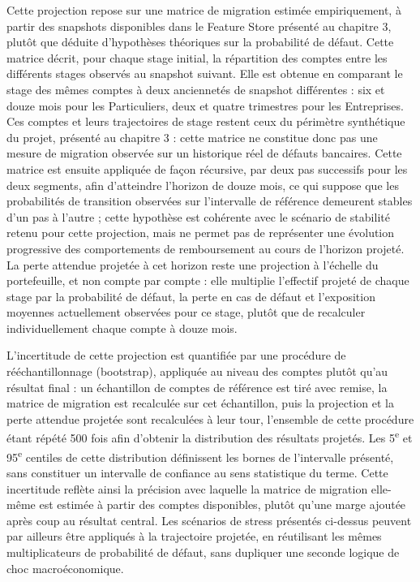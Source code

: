 Cette projection repose sur une matrice de migration estimée empiriquement, à partir des snapshots disponibles dans le Feature Store présenté au chapitre 3, plutôt que déduite d'hypothèses théoriques sur la probabilité de défaut. Cette matrice décrit, pour chaque stage initial, la répartition des comptes entre les différents stages observés au snapshot suivant. Elle est obtenue en comparant le stage des mêmes comptes à deux anciennetés de snapshot différentes : six et douze mois pour les Particuliers, deux et quatre trimestres pour les Entreprises. Ces comptes et leurs trajectoires de stage restent ceux du périmètre synthétique du projet, présenté au chapitre 3 : cette matrice ne constitue donc pas une mesure de migration observée sur un historique réel de défauts bancaires. Cette matrice est ensuite appliquée de façon récursive, par deux pas successifs pour les deux segments, afin d'atteindre l'horizon de douze mois, ce qui suppose que les probabilités de transition observées sur l'intervalle de référence demeurent stables d'un pas à l'autre ; cette hypothèse est cohérente avec le scénario de stabilité retenu pour cette projection, mais ne permet pas de représenter une évolution progressive des comportements de remboursement au cours de l'horizon projeté. La perte attendue projetée à cet horizon reste une projection à l'échelle du portefeuille, et non compte par compte : elle multiplie l'effectif projeté de chaque stage par la probabilité de défaut, la perte en cas de défaut et l'exposition moyennes actuellement observées pour ce stage, plutôt que de recalculer individuellement chaque compte à douze mois.

L'incertitude de cette projection est quantifiée par une procédure de rééchantillonnage (bootstrap), appliquée au niveau des comptes plutôt qu'au résultat final : un échantillon de comptes de référence est tiré avec remise, la matrice de migration est recalculée sur cet échantillon, puis la projection et la perte attendue projetée sont recalculées à leur tour, l'ensemble de cette procédure étant répété 500 fois afin d'obtenir la distribution des résultats projetés. Les 5\textsuperscript{e} et 95\textsuperscript{e} centiles de cette distribution définissent les bornes de l'intervalle présenté, sans constituer un intervalle de confiance au sens statistique du terme. Cette incertitude reflète ainsi la précision avec laquelle la matrice de migration elle-même est estimée à partir des comptes disponibles, plutôt qu'une marge ajoutée après coup au résultat central. Les scénarios de stress présentés ci-dessus peuvent par ailleurs être appliqués à la trajectoire projetée, en réutilisant les mêmes multiplicateurs de probabilité de défaut, sans dupliquer une seconde logique de choc macroéconomique.


